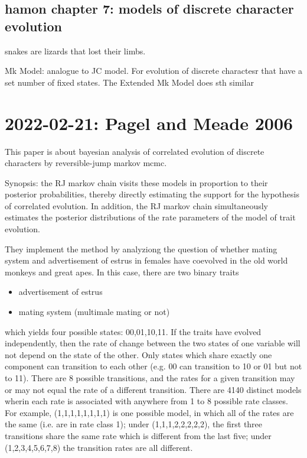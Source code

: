\documentclass{article}
\begin{document}
\subsection{hamon chapter 7: models of discrete character evolution}
snakes are lizards that lost their limbs.

Mk Model: analogue to JC model. For evolution of discrete charactesr that have a
set number of fixed states. The Extended Mk Model does sth similar

\section{2022-02-21: Pagel and Meade 2006}
This paper is about bayesian analysis of correlated evolution of discrete
characters by reversible-jump markov mcmc.

Synopsis: the RJ markov chain visits these models in proportion to their
posterior probabilities, thereby directly estimating the support for the
hypothesis of correlated evolution. In addition, the RJ markov chain
simultaneously estimates the posterior distributions of the rate parameters of
the model of trait evolution.

They implement the method by analyziong the question of whether mating system
and advertisement of estrus in females have coevolved in the old world monkeys
and great apes. In this case, there are two binary traits
\begin{itemize}
\item advertisement of estrus
\item mating system (multimale mating or not)
\end{itemize} 
which yields four possible states: 00,01,10,11. If the traits have evolved
independently, then the rate of change between the two states of one variable
will not depend on the state of the other. Only states which share exactly one
component can transition to each other (e.g. 00 can transition to 10 or 01 but
not to 11). There are 8 possible transitions, and the rates for a given
transition may or may not equal the rate of a different transition. There are
4140 distinct models wherin each rate is associated with anywhere from 1 to 8
possible rate classes. For example, (1,1,1,1,1,1,1,1) is one possible model, in
which all of the rates are the same (i.e. are in rate class 1); under
(1,1,1,2,2,2,2,2), the first three transitions share the same rate which is
different from the last five; under (1,2,3,4,5,6,7,8) the transition rates are
all different.
\end{document}
